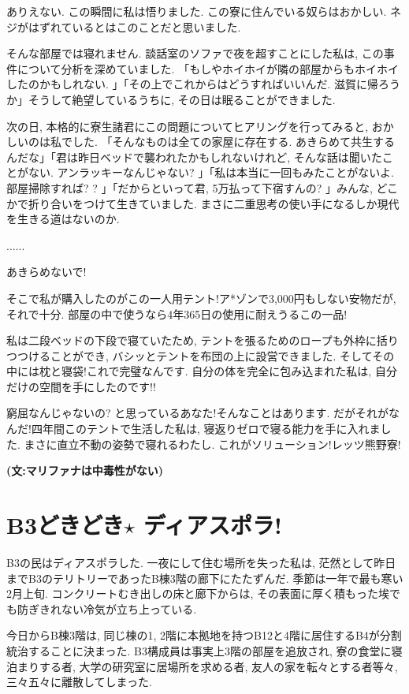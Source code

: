 \documentclass[10pt,b5jsbook,dvips,dvipdfmx,openany]{jsbook}
\theoremstyle{definition}
\begin{document}
    ありえない. この瞬間に私は悟りました. この寮に住んでいる奴らはおかしい. ネジがはずれているとはこのことだと思いました.

    そんな部屋では寝れません. 談話室のソファで夜を超すことにした私は, この事件について分析を深めていました. 「もしやホイホイが隣の部屋からもホイホイしたのかもしれない. 」「その上でこれからはどうすればいいんだ. 滋賀に帰ろうか」そうして絶望しているうちに, その日は眠ることができました.

    次の日, 本格的に寮生諸君にこの問題についてヒアリングを行ってみると, おかしいのは私でした. 「そんなものは全ての家屋に存在する. あきらめて共生するんだな」「君は昨日ベッドで襲われたかもしれないけれど, そんな話は聞いたことがない. アンラッキーなんじゃない? 」「私は本当に一回もみたことがないよ. 部屋掃除すれば? ? 」「だからといって君, 5万払って下宿すんの? 」みんな, どこかで折り合いをつけて生きていました. まさに二重思考の使い手になるしか現代を生きる道はないのか.

    ......

    あきらめないで!

    そこで私が購入したのがこの一人用テント!ア*ゾンで3,000円もしない安物だが, それで十分. 部屋の中で使うなら4年365日の使用に耐えうるこの一品!

    私は二段ベッドの下段で寝ていたため, テントを張るためのロープも外枠に括りつつけることができ, バシッとテントを布団の上に設営できました. そしてその中には枕と寝袋!これで完璧なんです. 自分の体を完全に包み込まれた私は, 自分だけの空間を手にしたのです!!

    窮屈なんじゃないの? と思っているあなた!そんなことはあります. だがそれがなんだ!四年間このテントで生活した私は, 寝返りゼロで寝る能力を手に入れました. まさに直立不動の姿勢で寝れるわたし. これがソリューション!レッツ熊野寮!

    {\bf (文:マリファナは中毒性がない)}



	\section{B3どきどき$ \star$ ディアスポラ! }

	B3の民はディアスポラした. 一夜にして住む場所を失った私は, 茫然として昨日までB3のテリトリーであったB棟3階の廊下にたたずんだ. 季節は一年で最も寒い2月上旬. コンクリートむき出しの床と廊下からは, その表面に厚く積もった埃でも防ぎきれない冷気が立ち上っている.

	今日からB棟3階は, 同じ棟の1, 2階に本拠地を持つB12と4階に居住するB4が分割統治することに決まった. B3構成員は事実上3階の部屋を追放され, 寮の食堂に寝泊まりする者, 大学の研究室に居場所を求める者, 友人の家を転々とする者等々, 三々五々に離散してしまった.
\end{document}
